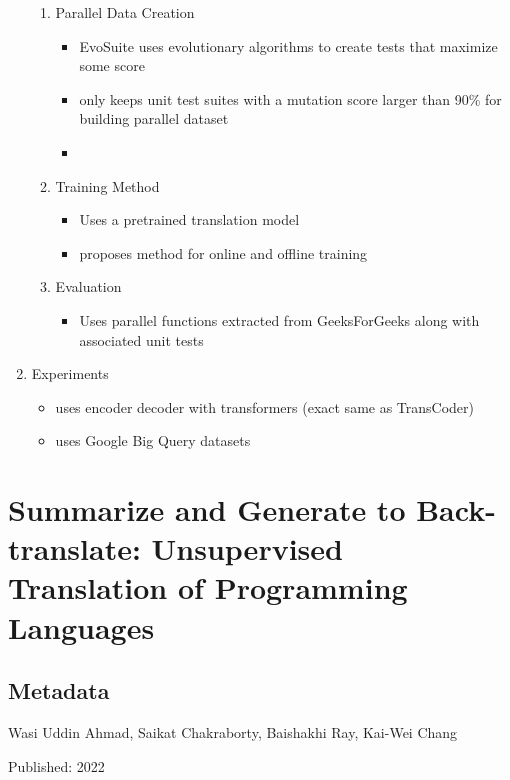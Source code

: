 \documentclass{article}
\begin{document}
\begin{enumerate}
\begin{enumerate}
		\item Parallel Data Creation
		\begin{itemize}
			\item EvoSuite uses evolutionary algorithms to create tests that maximize some score
			\item only keeps unit test suites with a mutation score larger than 90\% for building parallel dataset
			\item
		\end{itemize}
		\item Training Method
		\begin{itemize}
			\item Uses a pretrained translation model
			\item proposes method for online and offline training
		\end{itemize}
		\item Evaluation
		\begin{itemize}
			\item Uses parallel functions extracted from GeeksForGeeks along with associated unit tests
		\end{itemize}
	\end{enumerate}
	\item Experiments
	\begin{itemize}
		\item uses encoder decoder with transformers (exact same as TransCoder)
		\item uses Google Big Query datasets
	\end{itemize}
\end{enumerate}

\pagebreak


\section*{Summarize and Generate to Back-translate: Unsupervised Translation of Programming Languages}

\subsection*{Metadata}

\noindent Wasi Uddin Ahmad, Saikat Chakraborty, Baishakhi Ray, Kai-Wei Chang

\noindent Published: 2022
\end{document}
